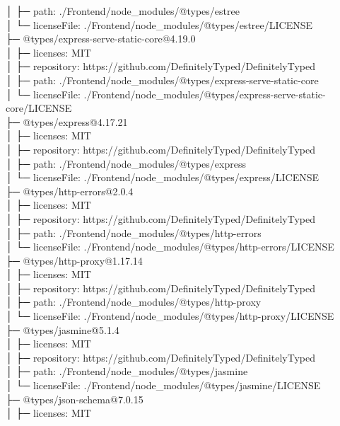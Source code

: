 │  ├─ path: ./Frontend/node\_modules/@types/estree\\
│  └─ licenseFile: ./Frontend/node\_modules/@types/estree/LICENSE\\
├─ @types/express-serve-static-core@4.19.0\\
│  ├─ licenses: MIT\\
│  ├─ repository: https://github.com/DefinitelyTyped/DefinitelyTyped\\
│  ├─ path: ./Frontend/node\_modules/@types/express-serve-static-core\\
│  └─ licenseFile: ./Frontend/node\_modules/@types/express-serve-static-core/LICENSE\\
├─ @types/express@4.17.21\\
│  ├─ licenses: MIT\\
│  ├─ repository: https://github.com/DefinitelyTyped/DefinitelyTyped\\
│  ├─ path: ./Frontend/node\_modules/@types/express\\
│  └─ licenseFile: ./Frontend/node\_modules/@types/express/LICENSE\\
├─ @types/http-errors@2.0.4\\
│  ├─ licenses: MIT\\
│  ├─ repository: https://github.com/DefinitelyTyped/DefinitelyTyped\\
│  ├─ path: ./Frontend/node\_modules/@types/http-errors\\
│  └─ licenseFile: ./Frontend/node\_modules/@types/http-errors/LICENSE\\
├─ @types/http-proxy@1.17.14\\
│  ├─ licenses: MIT\\
│  ├─ repository: https://github.com/DefinitelyTyped/DefinitelyTyped\\
│  ├─ path: ./Frontend/node\_modules/@types/http-proxy\\
│  └─ licenseFile: ./Frontend/node\_modules/@types/http-proxy/LICENSE\\
├─ @types/jasmine@5.1.4\\
│  ├─ licenses: MIT\\
│  ├─ repository: https://github.com/DefinitelyTyped/DefinitelyTyped\\
│  ├─ path: ./Frontend/node\_modules/@types/jasmine\\
│  └─ licenseFile: ./Frontend/node\_modules/@types/jasmine/LICENSE\\
├─ @types/json-schema@7.0.15\\
│  ├─ licenses: MIT\\

